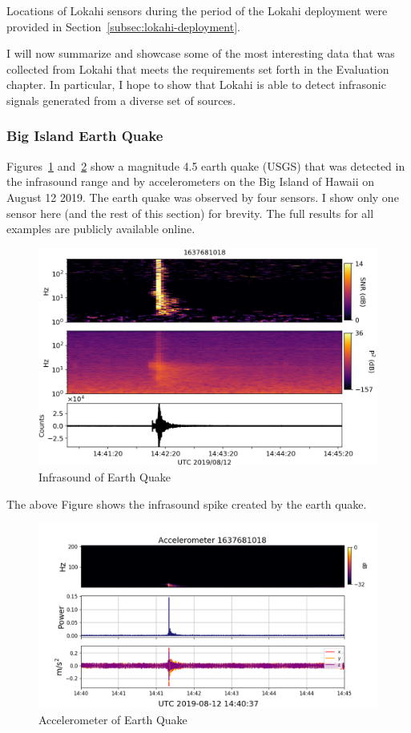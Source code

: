 Locations of Lokahi sensors during the period of the Lokahi deployment were provided in Section~\ref{subsec:lokahi-deployment}.

I will now summarize and showcase some of the most interesting data that was collected from Lokahi that meets the requirements set forth in the Evaluation chapter. In particular, I hope to show that Lokahi is able to detect infrasonic signals generated from a diverse set of sources.

\subsubsection{Big Island Earth Quake}
Figures~\ref{fig:quake_1} and~\ref{fig:quake_2} show a magnitude 4.5 earth quake (USGS\cite{usgs_quake}) that was detected in the infrasound range and by accelerometers on the Big Island of Hawaii on August 12 2019. The earth quake was observed by four sensors. I show only one sensor here (and the rest of this section) for brevity. The full results for all examples are publicly available online\cite{redvox_reports}.

\begin{figure}[H]
    \centering
    \includegraphics[width=\linewidth]{figures/quake_1.png}
    \caption{Infrasound of Earth Quake}
    \label{fig:quake_1}
\end{figure}

The above Figure shows the infrasound spike created by the earth quake.

\begin{figure}[H]
    \centering
    \includegraphics[width=\linewidth]{figures/quake_2.png}
    \caption{Accelerometer of Earth Quake}
    \label{fig:quake_2}
\end{figure}

